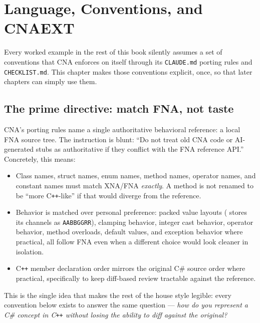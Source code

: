 \chapter{Language, Conventions, and CNAEXT}
\label{ch:language-conventions-cnaext}
\label{ch:design-philosophy}

Every worked example in the rest of this book silently assumes a set of conventions that CNA
enforces on itself through its \texttt{CLAUDE.md} porting rules and \texttt{CHECKLIST.md}.
This chapter makes those conventions explicit, once, so that later chapters can simply use
them.

\section{The prime directive: match FNA, not taste}

CNA's porting rules name a single authoritative behavioral reference: a local FNA source
tree. The instruction is blunt: ``Do not treat old CNA code or AI-generated stubs as
authoritative if they conflict with the FNA reference API.'' Concretely, this means:

\begin{itemize}
  \item Class names, struct names, enum names, method names, operator names, and constant
        names must match XNA/FNA \emph{exactly}. A method is not renamed to be ``more
        C\texttt{++}-like'' if that would diverge from the reference.
  \item Behavior is matched over personal preference: packed value layouts (
        stores its channels as \texttt{AABBGGRR}), clamping behavior, integer cast behavior,
        operator behavior, method overloads, default values, and exception behavior where
        practical, all follow FNA even when a different choice would look cleaner in
        isolation.
  \item C\texttt{++} member declaration order mirrors the original C\# source order where
        practical, specifically to keep diff-based review tractable against the reference.
\end{itemize}

This is the single idea that makes the rest of the house style legible: every convention
below exists to answer the same question --- \emph{how do you represent a C\# concept in
C\texttt{++} without losing the ability to diff against the original?}

